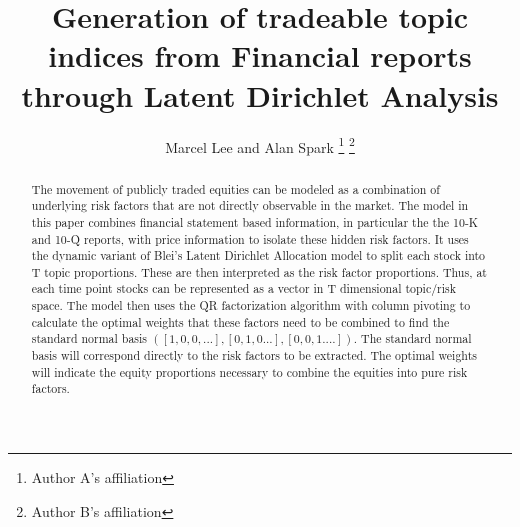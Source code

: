 \documentclass[12pt,journal,letterpaper,oneside,onecolumn]{IEEEtran}
\begin{document}
%
\title{Generation of tradeable topic indices from Financial reports through Latent Dirichlet Analysis}

\author{
Marcel Lee
and Alan Spark%
\thanks{Author A's affiliation}%
\thanks{Author B's affiliation}%
}



\maketitle

\begin{abstract}
The movement of publicly traded equities can be modeled as a combination of 
underlying risk factors that are not directly observable in the market. The  model in this paper combines financial statement based information, in particular the the 10-K and 10-Q reports, with price information to isolate these hidden risk factors.
It uses the dynamic variant of Blei's Latent Dirichlet Allocation model to split each stock into T topic proportions. These are then interpreted as the risk factor proportions.
Thus, at each time point stocks can be represented as a vector in T dimensional topic/risk space.
The model then uses the QR factorization algorithm with column pivoting to calculate the optimal weights that these factors need to be combined to find the standard normal basis $([1,0,0,...], [0,1,0...], [0,0,1....])$.
The standard normal basis will correspond directly to the risk factors to be extracted. The optimal weights will indicate the equity proportions necessary to combine the equities into pure risk factors.
\end{abstract}
\end{document}
